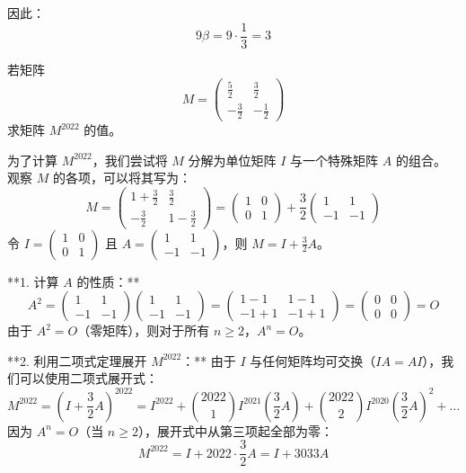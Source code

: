 \begin{questions}
\begin{solution}
因此：
\[
9\beta = 9 \cdot \frac{1}{3} = 3
\]
\end{solution}

\question
若矩阵
\[
M = \begin{pmatrix} \frac{5}{2} & \frac{3}{2} \\ -\frac{3}{2} & -\frac{1}{2} \end{pmatrix}
\]
求矩阵 $M^{2022}$ 的值。

\begin{solution}
为了计算 $M^{2022}$，我们尝试将 $M$ 分解为单位矩阵 $I$ 与一个特殊矩阵 $A$ 的组合。
观察 $M$ 的各项，可以将其写为：
\[
M = \begin{pmatrix} 1 + \frac{3}{2} & \frac{3}{2} \\ -\frac{3}{2} & 1 - \frac{3}{2} \end{pmatrix} = \begin{pmatrix} 1 & 0 \\ 0 & 1 \end{pmatrix} + \frac{3}{2} \begin{pmatrix} 1 & 1 \\ -1 & -1 \end{pmatrix}
\]
令 $I = \begin{pmatrix} 1 & 0 \\ 0 & 1 \end{pmatrix}$ 且 $A = \begin{pmatrix} 1 & 1 \\ -1 & -1 \end{pmatrix}$，则 $M = I + \frac{3}{2}A$。

**1. 计算 $A$ 的性质：**
\[
A^2 = \begin{pmatrix} 1 & 1 \\ -1 & -1 \end{pmatrix} \begin{pmatrix} 1 & 1 \\ -1 & -1 \end{pmatrix} = \begin{pmatrix} 1-1 & 1-1 \\ -1+1 & -1+1 \end{pmatrix} = \begin{pmatrix} 0 & 0 \\ 0 & 0 \end{pmatrix} = O
\]
由于 $A^2 = O$（零矩阵），则对于所有 $n \ge 2$，$A^n = O$。

**2. 利用二项式定理展开 $M^{2022}$：**
由于 $I$ 与任何矩阵均可交换（$IA = AI$），我们可以使用二项式展开式：
\[
M^{2022} = (I + \frac{3}{2}A)^{2022} = I^{2022} + \binom{2022}{1} I^{2021} (\frac{3}{2}A) + \binom{2022}{2} I^{2020} (\frac{3}{2}A)^2 + \dots
\]
因为 $A^n = O$（当 $n \ge 2$），展开式中从第三项起全部为零：
\[
M^{2022} = I + 2022 \cdot \frac{3}{2}A = I + 3033A
\]


\end{solution}
\end{questions}
